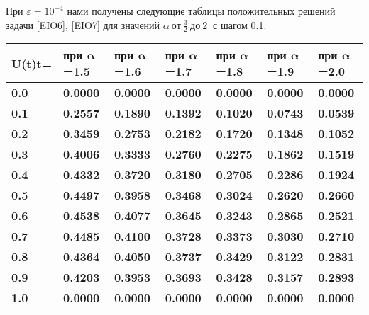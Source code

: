 При $\varepsilon ={10}^{-4}$ нами получены следующие таблицы положительных решений задачи \eqref{EIO6}, \eqref{EIO7} для значений $\alpha \ от\ \frac{3}{2}\ до\ 2\ $ с шагом 0.1.
$$ $$
\begin{tabular}{|p{0.2in}|p{0.5in}|p{0.5in}|p{0.5in}|p{0.5in}|p{0.5in}|p{0.5in}|} \hline
\textbf{U(t)\newline \newline t=} & \textbf{при }${\mathbf \alpha }$\textbf{=1.5} & \textbf{при }${\mathbf \alpha }$\textbf{=1.6} & \textbf{при }${\mathbf \alpha }$\textbf{=1.7} & \textbf{при }${\mathbf \alpha }$\textbf{=1.8} & \textbf{при }${\mathbf \alpha }$\textbf{=1.9} & \textbf{    при }${\mathbf \alpha }$\textbf{=2.0      } \\ \hline
\textbf{0.0} & \textbf{0.0000} & \textbf{0.0000} & \textbf{0.0000} & \textbf{0.0000} & \textbf{0.0000} & \textbf{0.0000} \\ \hline
\textbf{0.1} & \textbf{0.2557} & \textbf{0.1890} & \textbf{0.1392} & \textbf{0.1020} & \textbf{0.0743} & \textbf{0.0539} \\ \hline
\textbf{0.2} & \textbf{0.3459} & \textbf{0.2753} & \textbf{0.2182} & \textbf{0.1720} & \textbf{0.1348} & \textbf{0.1052} \\ \hline
\textbf{0.3} & \textbf{0.4006} & \textbf{0.3333} & \textbf{0.2760} & \textbf{0.2275} & \textbf{0.1862} & \textbf{0.1519} \\ \hline
\textbf{0.4} & \textbf{0.4332} & \textbf{0.3720} & \textbf{0.3180} & \textbf{0.2705} & \textbf{0.2286} & \textbf{0.1924} \\ \hline
\textbf{0.5} & \textbf{0.4497} & \textbf{0.3958} & \textbf{0.3468} & \textbf{0.3024} & \textbf{0.2620} & \textbf{0.2660} \\ \hline
\textbf{0.6} & \textbf{0.4538} & \textbf{0.4077} & \textbf{0.3645} & \textbf{0.3243} & \textbf{0.2865} & \textbf{0.2521} \\ \hline
\textbf{0.7} & \textbf{0.4485} & \textbf{0.4100} & \textbf{0.3728} & \textbf{0.3373} & \textbf{0.3030} & \textbf{0.2710} \\ \hline
\textbf{0.8} & \textbf{0.4364} & \textbf{0.4050} & \textbf{0.3737} & \textbf{0.3429} & \textbf{0.3122} & \textbf{0.2831} \\ \hline
\textbf{0.9} & \textbf{0.4203} & \textbf{0.3953} & \textbf{0.3693} & \textbf{0.3428} & \textbf{0.3157} & \textbf{0.2893} \\ \hline
\textbf{1.0} & \textbf{0.0000} & \textbf{0.0000} & \textbf{0.0000} & \textbf{0.0000} & \textbf{0.0000} & \textbf{0.0000} \\ \hline
\end{tabular}
$$ $$

